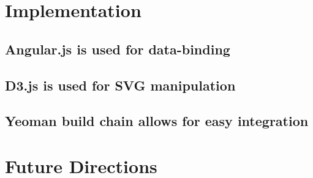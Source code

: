 \section{Implementation}
\subsection{Angular.js is used for data-binding}
\subsection{D3.js is used for SVG manipulation}
\subsection{Yeoman build chain allows for easy integration}

\section{Future Directions}
\autocite{w3c2014components}
\autocite{w3c2014templating}
\autocite{polymer2014templating}
